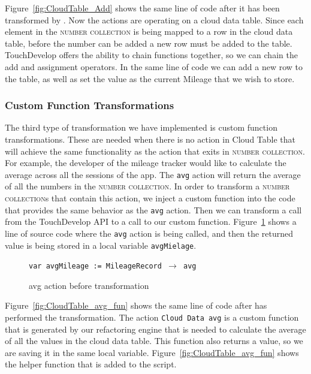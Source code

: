 \documentclass{sigplanconf}
\begin{document}
Figure~\ref{fig:CloudTable_Add} shows the same line of code after it has been transformed by  \tool.  Now the actions are operating on a cloud data table.  Since each element in the \textsc{number collection} is being mapped to a row in the cloud data table, before the number can be added a new row must be added to the table.  TouchDevelop offers the ability to chain functions together, so we can chain the add and assignment operators.  In the same line of code we can add a new row to the table, as well as set the value as the current Mileage that we wish to store.


\subsubsection{Custom Function Transformations}
The third type of transformation we have implemented is custom function transformations.  These are needed when there is no action in Cloud Table that will achieve the same functionality as the action that exits in  \textsc{number collection}. For example, the developer of the mileage tracker would like to calculate the average across all the sessions of the app.  The \texttt{avg} action will return the average of all the numbers in the \textsc{number collection}.  In order to transform a \textsc{number collection}s that contain this action, we inject a custom function into the code that provides the same behavior as the \texttt{avg} action.  Then we can transform a call from the TouchDevelop API to a call to our custom function.  Figure~\ref{fig:numCol_avg} shows a line of source code where the \texttt{avg} action is being called, and then the returned value is being stored in a local variable \texttt{avgMielage}.


\begin{figure}[htbp!]
\begin{center}
\texttt{var avgMileage := MileageRecord $\rightarrow$ avg}
\nocaptionrule
\caption{avg action before transformation}
\label{fig:numCol_avg}
\end{center}
\end{figure}

Figure~\ref{fig:CloudTable_avg_fun} shows the same line of code after \tool has performed the transformation.  The action \texttt{Cloud Data avg} is a custom function that is generated by our refactoring engine that is needed to calculate the average of all the values in the cloud data table.  This function also returns a value, so we are saving it in the same local variable.  Figure~\ref{fig:CloudTable_avg_fun} shows the helper function that is added to the script.
\end{document}
